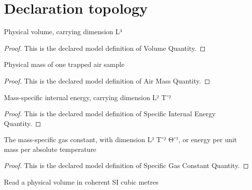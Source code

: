 \section{Declaration topology}
\begin{definition}
  \label{def:physics:phyx-mini-0458:phyxminiproblems-problemphyxmini0458-volumequantity}
  Physical volume, carrying dimension L³
\end{definition}
\begin{proof}
  This is the declared model definition of Volume Quantity.
\end{proof}
\begin{definition}
  \label{def:physics:phyx-mini-0458:phyxminiproblems-problemphyxmini0458-airmassquantity}
  Physical mass of one trapped air sample
\end{definition}
\begin{proof}
  This is the declared model definition of Air Mass Quantity.
\end{proof}
\begin{definition}
  \label{def:physics:phyx-mini-0458:phyxminiproblems-problemphyxmini0458-specificinternalenergyquantity}
  Mass-specific internal energy, carrying dimension L² T⁻²
\end{definition}
\begin{proof}
  This is the declared model definition of Specific Internal Energy Quantity.
\end{proof}
\begin{definition}
  \label{def:physics:phyx-mini-0458:phyxminiproblems-problemphyxmini0458-specificgasconstantquantity}
  The mass-specific gas constant, with dimension L² T⁻² Θ⁻¹, or energy per unit mass per absolute temperature
\end{definition}
\begin{proof}
  This is the declared model definition of Specific Gas Constant Quantity.
\end{proof}
\begin{definition}
  \label{def:physics:phyx-mini-0458:phyxminiproblems-problemphyxmini0458-volumeincubicmeters}
  Read a physical volume in coherent SI cubic metres
\end{definition}
